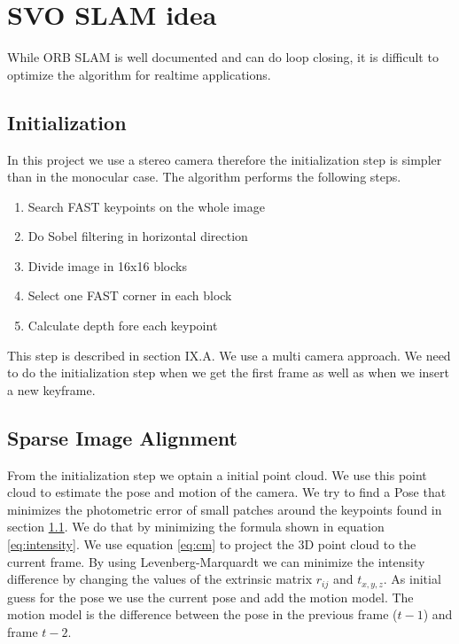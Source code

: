 \documentclass[11pt,a4paper,titlepage,oneside]{report}
\begin{document}
\section{SVO SLAM idea}
While ORB SLAM is well documented and can do loop closing, it is difficult to optimize the algorithm for realtime applications.

\subsection{Initialization}\label{sec:initialization}
In this project we use a stereo camera therefore the initialization step is simpler than in the monocular case. The algorithm performs the following steps.
\begin{enumerate}
	\item{Search FAST keypoints on the whole image}
	\item{Do Sobel filtering in horizontal direction}
	\item{Divide image in 16x16 blocks}
	\item{Select one FAST corner in each block}
	\item{Calculate depth fore each keypoint}
\end{enumerate}

This step is described in \cite{svo2} section IX.A. We use a multi camera approach. We need to do the initialization step when we get the first frame as well as when we insert a new keyframe.

\subsection{Sparse Image Alignment}\label{sec:sia}

From the initialization step we optain a initial point cloud. We use this point cloud to estimate the pose and motion of the camera. We try to find a Pose that minimizes the photometric error of small patches around the keypoints found in section \ref{sec:initialization}. We do that by minimizing the formula shown in equation \ref{eq:intensity}. We use equation \ref{eq:cm} to project the 3D point cloud to the current frame. By using Levenberg-Marquardt we can minimize the intensity difference by changing the values of the extrinsic matrix $r_{ij}$ and $t_{x,y,z}$. As initial guess for the pose we use the current pose and add the motion model. The motion model is the difference between the pose in the previous frame ($t-1$) and frame $t-2$.
\end{document}
